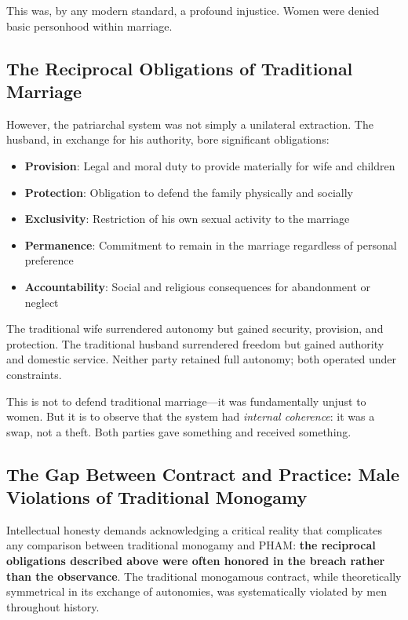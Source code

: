 \documentclass[12pt,openany]{book}
\numberwithin{equation}{chapter}
\begin{document}
This was, by any modern standard, a profound injustice. Women were denied basic personhood within marriage.

\subsection{The Reciprocal Obligations of Traditional Marriage}

However, the patriarchal system was not simply a unilateral extraction. The husband, in exchange for his authority, bore significant obligations:

\begin{itemize}
    \item \textbf{Provision}: Legal and moral duty to provide materially for wife and children
    \item \textbf{Protection}: Obligation to defend the family physically and socially
    \item \textbf{Exclusivity}: Restriction of his own sexual activity to the marriage
    \item \textbf{Permanence}: Commitment to remain in the marriage regardless of personal preference
    \item \textbf{Accountability}: Social and religious consequences for abandonment or neglect
\end{itemize}

The traditional wife surrendered autonomy but gained security, provision, and protection. The traditional husband surrendered freedom but gained authority and domestic service. Neither party retained full autonomy; both operated under constraints.

This is not to defend traditional marriage---it was fundamentally unjust to women. But it is to observe that the system had \textit{internal coherence}: it was a swap, not a theft. Both parties gave something and received something.

\subsection{The Gap Between Contract and Practice: Male Violations of Traditional Monogamy}

Intellectual honesty demands acknowledging a critical reality that complicates any comparison between traditional monogamy and PHAM: \textbf{the reciprocal obligations described above were often honored in the breach rather than the observance}. The traditional monogamous contract, while theoretically symmetrical in its exchange of autonomies, was systematically violated by men throughout history.
\end{document}
